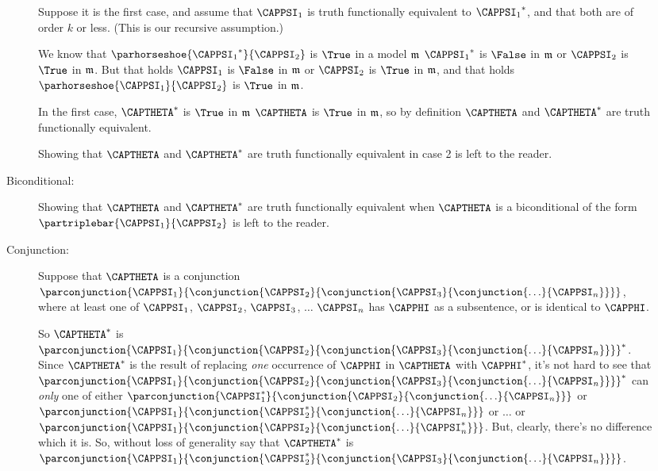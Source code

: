 \begin{PROOF}
\begin{description}
\begin{description}
Suppose it is the first case, and assume that $\CAPPSI_1$ is truth functionally equivalent to ${\CAPPSI_1}^*$, and that both are of order $k$ or less.
(This is our recursive assumption.)

We know that  $\parhorseshoe{{\CAPPSI_1}^*}{\CAPPSI_2}$ is $\True$ in a model $\mathfrak{m}$ \Iff ${\CAPPSI_1}^*$ is $\False$ in $\mathfrak{m}$ or $\CAPPSI_2$ is $\True$ in $\mathfrak{m}$. 
But that holds \Iff $\CAPPSI_1$ is $\False$ in $\mathfrak{m}$ or $\CAPPSI_2$ is $\True$ in $\mathfrak{m}$, and that holds \Iff $\parhorseshoe{\CAPPSI_1}{\CAPPSI_2}$ is $\True$ in $\mathfrak{m}$. 

In the first case, $\CAPTHETA^*$ is $\True$ in $\mathfrak{m}$ \Iff $\CAPTHETA$ is $\True$ in $\mathfrak{m}$, so by definition $\CAPTHETA$ and $\CAPTHETA^*$ are truth functionally equivalent.

Showing that $\CAPTHETA$ and $\CAPTHETA^*$ are truth functionally equivalent in case 2 is left to the reader.

\item[Biconditional:] Showing that $\CAPTHETA$ and $\CAPTHETA^*$ are truth functionally equivalent when $\CAPTHETA$ is a biconditional of the form $\partriplebar{\CAPPSI_1}{\CAPPSI_2}$ is left to the reader.

\item[Conjunction:] Suppose that $\CAPTHETA$ is a conjunction $\parconjunction{\CAPPSI_1}{\conjunction{\CAPPSI_2}{\conjunction{\CAPPSI_3}{\conjunction{\ldots}{\CAPPSI_{\integer{n}}}}}}$, where at least one of $\CAPPSI_1$, $\CAPPSI_2$, $\CAPPSI_3$, $\ldots$ $\CAPPSI_{\integer{n}}$ has $\CAPPHI$ as a subsentence, or is identical to $\CAPPHI$. 

So $\CAPTHETA^*$ is $\parconjunction{\CAPPSI_1}{\conjunction{\CAPPSI_2}{\conjunction{\CAPPSI_3}{\conjunction{\ldots}{\CAPPSI_{\integer{n}}}}}}^*$. Since $\CAPTHETA^*$ is the result of replacing \emph{one} occurrence of $\CAPPHI$ in $\CAPTHETA$ with $\CAPPHI^*$, it's not hard to see that $\parconjunction{\CAPPSI_1}{\conjunction{\CAPPSI_2}{\conjunction{\CAPPSI_3}{\conjunction{\ldots}{\CAPPSI_{\integer{n}}}}}}^*$ can \emph{only} one of either $\parconjunction{\CAPPSI_1^*}{\conjunction{\CAPPSI_2}{\conjunction{\ldots}{\CAPPSI_{\integer{n}}}}}$ or $\parconjunction{\CAPPSI_1}{\conjunction{\CAPPSI_2^*}{\conjunction{\ldots}{\CAPPSI_{\integer{n}}}}}$ or $\ldots$ or $\parconjunction{\CAPPSI_1}{\conjunction{\CAPPSI_2}{\conjunction{\ldots}{\CAPPSI_{\integer{n}}^*}}}$. 
But, clearly, there's no difference which it is. 
So, without loss of generality say that $\CAPTHETA^*$ is $\parconjunction{\CAPPSI_1}{\conjunction{\CAPPSI_2^*}{\conjunction{\CAPPSI_3}{\conjunction{\ldots}{\CAPPSI_{\integer{n}}}}}}$. 


\end{description}
\end{description}
\end{PROOF}

